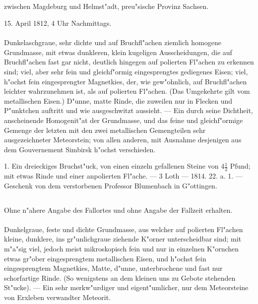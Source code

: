 \documentclass[a4paper, 11pt, oneside, polutonikogreek, german]{article}
\begin{document}
\subsection[\swabfamily {Erxleben.}]{}
\begin{center}

zwischen Magdeburg und Helmst"adt, preu"sische Provinz Sachsen.

15. April 1812, 4 Uhr Nachmittags.
\end{center}
\paragraph{}
Dunkelaschgraue, sehr dichte und auf Bruchfl"achen ziemlich homogene Grundmasse, mit etwas dunkleren, klein kugeligen Ausscheidungen, die auf Bruchfl"achen fast gar nicht, deutlich hingegen auf polierten Fl"achen zu erkennen sind; viel, aber sehr fein und gleichf"ormig eingesprengtes gediegenes Eisen; viel, h"ochst fein eingesprengter Magnetkies, der, wie gew"ohnlich, auf Bruchfl"achen leichter wahrzunehmen ist, als auf polierten Fl"achen. (Das Umgekehrte gilt vom metallischen Eisen.) D"unne, matte Rinde, die zuweilen nur in Flecken und P"unktchen auftritt und wie ausgeschwitzt aussieht. --- Ein durch seine Dichtheit, anscheinende Homogenit"at der Grundmasse, und das feine und gleichf"ormige Gemenge der letzten mit den zwei metallischen Gemengteilen sehr ausgezeichneter Meteorstein; von allen anderen, mit Ausnahme desjenigen aus dem Gouvernement Simbirsk h"ochst verschieden.

1. Ein dreieckiges Bruchst"uck, von einen einzeln gefallenen Steine von $\mathfrak{4\frac{1}{2}}$ Pfund; mit etwas Rinde und einer anpolierten Fl"ache. --- 3 Loth --- 1814. 22. a. 1. --- Geschenk von dem verstorbenen Professor Blumenbach in G"ottingen.
\subsection{}
\begin{center}

Ohne n"ahere Angabe des Fallortes und ohne Angabe der Fallzeit erhalten.
\end{center}
\paragraph{}
Dunkelgraue, feste und dichte Grundmasse, aus welcher auf polierten Fl"achen kleine, dunklere, ins gr"unlichgraue ziehende K"orner unterscheidbar sind; mit m"a"sig viel, jedoch meist mikroskopisch fein und nur in einzelnen K"ornchen etwas gr"ober eingesprengtem metallischen Eisen, und h"ochst fein eingesprengtem Magnetkies, Matte, d"unne, unterbrochene und fast nur schorfartige Rinde. (So wenigstens an dem kleinen uns zu Gebote stehenden St"ucke). --- Ein sehr merkw"urdiger und eigent"umlicher, nur dem Meteorsteine von Erxleben verwandter Meteorit.
\end{document}

